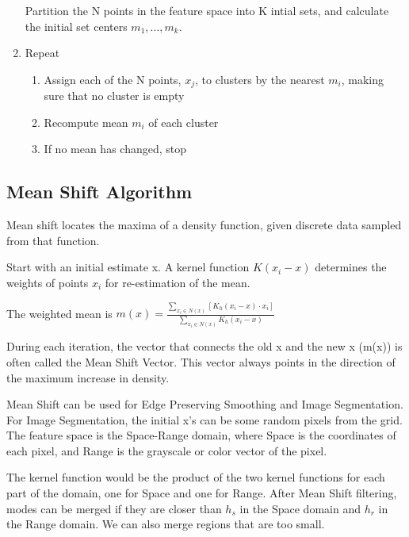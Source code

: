 \documentclass{article}
\begin{document}
\begin{multicols}{2}
\begin{enumerate}
  Partition the N points in the feature space into K intial sets, and calculate the initial set centers $m_1, ..., m_k$.

  \item {Repeat}
  
  \begin{enumerate}
    \item {Assign each of the N points, $x_j$, to clusters by the nearest $m_i$, making sure that no cluster is empty}
    \item {Recompute mean $m_i$ of each cluster}
    \item {If no mean has changed, stop}
  \end{enumerate}

\end{enumerate}

\subsection{Mean Shift Algorithm}

Mean shift locates the maxima of a density function, given discrete data sampled from that function.

Start with an initial estimate x. A kernel function $K(x_i-x)$ determines the weights of points $x_i$ for re-estimation of the mean.

The weighted mean is $m(x) = \frac{\sum _{x_i \in N(x)}[K_h(x_i-x) \cdot x_i]}{\sum _{x_i \in N(x)}K_h(x_i-x)}$

During each iteration, the vector that connects the old x and the new x (m(x)) is often called the Mean Shift Vector. This vector always points in the direction of the maximum increase in density.

\vspace{2mm}

Mean Shift can be used for Edge Preserving Smoothing and Image Segmentation. For Image Segmentation, the initial x's can be some random pixels from the grid. The feature space is the Space-Range domain, where Space is the coordinates of each pixel, and Range is the grayscale or color vector of the pixel.

\vspace{2mm}

The kernel function would be the product of the two kernel functions for each part of the domain, one for Space and one for Range. After Mean Shift filtering, modes can be merged if they are closer than $h_s$ in the Space domain and $h_r$ in the Range domain. We can also merge regions that are too small.


\end{multicols}
\end{document}
